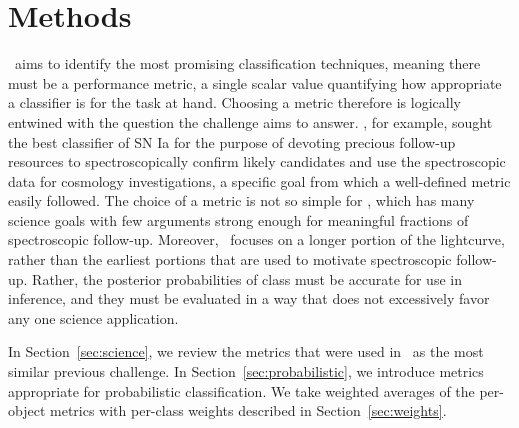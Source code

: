 \section{Methods}
\label{sec:methods}


\plasticc\ aims to identify the most promising classification techniques, meaning there must be a performance metric, a single scalar value quantifying how appropriate a classifier is for the task at hand.
Choosing a metric therefore is logically entwined with the question the challenge aims to answer.
\snphotcc, for example, sought the best classifier of SN Ia for the purpose of devoting precious follow-up resources to spectroscopically confirm likely candidates and use the spectroscopic data for cosmology investigations, a specific goal from which a well-defined metric easily followed.
The choice of a metric is not so simple for \plasticc, which has many science goals with few arguments strong enough for meaningful fractions of spectroscopic follow-up.
Moreover, \plasticc\ focuses on a longer portion of the lightcurve, rather than the earliest portions that are used to motivate spectroscopic follow-up.
Rather, the posterior probabilities of class must be accurate for use in inference, and they must be evaluated in a way that does not excessively favor any one science application.

In Section~\ref{sec:science}, we review the metrics that were used in \snphotcc\ as the most similar previous challenge.
In Section~\ref{sec:probabilistic}, we introduce metrics appropriate for probabilistic classification.
We take weighted averages of the per-object metrics with per-class weights described in Section~\ref{sec:weights}.

